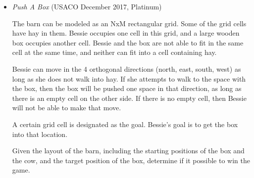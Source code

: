 \documentclass{article}
\begin{document}
\begin{itemize}[leftmargin=0pt]
\item[\label={}]
\textit{Push A Box} (USACO December 2017, Platinum)

The barn can be modeled as an NxM rectangular grid. Some of the grid cells have hay in them. Bessie occupies one cell in this grid, and a large wooden box occupies another cell. Bessie and the box are not able to fit in the same cell at the same time, and neither can fit into a cell containing hay.

Bessie can move in the 4 orthogonal directions (north, east, south, west) as long as she does not walk into hay. If she attempts to walk to the space with the box, then the box will be pushed one space in that direction, as long as there is an empty cell on the other side. If there is no empty cell, then Bessie will not be able to make that move.

A certain grid cell is designated as the goal. Bessie's goal is to get the box into that location.

Given the layout of the barn, including the starting positions of the box and the cow, and the target position of the box, determine if it possible to win the game.

\end{itemize}
\end{document}
